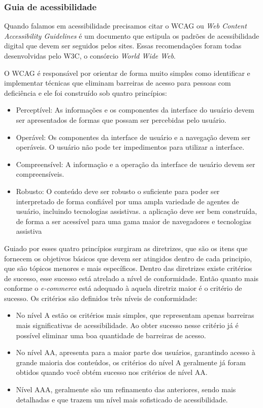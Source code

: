 \subsubsection{Guia de acessibilidade}
{Quando falamos em acessibilidade precisamos citar o WCAG ou \textit{Web Content Accessibility Guidelines} é um documento que estipula os padrões de acessibilidade digital que devem ser seguidos pelos sites. Essas recomendações foram todas desenvolvidas pelo W3C, o consórcio \textit{World Wide Web}.

O WCAG é responsável por orientar de forma muito simples como identificar e implementar técnicas que eliminam barreiras de acesso para pessoas com deficiência e ele foi construído sob quatro princípios:
\begin{itemize}
\item Perceptível: As informações e os componentes da interface do usuário devem ser apresentados de formas que possam ser percebidas pelo usuário.
\item Operável: Os componentes da interface de usuário e a navegação devem ser operáveis. O usuário não pode ter impedimentos para utilizar a interface.
\item Compreensível: A informação e a operação da interface de usuário devem ser compreensíveis. 
\item Robusto: O conteúdo deve ser robusto o suficiente para poder ser interpretado de forma confiável por uma ampla variedade de agentes de usuário, incluindo tecnologias assistivas. a aplicação deve ser bem construída, de forma a ser acessível para uma gama maior de navegadores e tecnologias assistiva
\end{itemize}

Guiado por esses quatro princípios surgiram as diretrizes, que são os itens que fornecem os objetivos básicos que devem ser atingidos dentro de cada principio, que são tópicos menores e mais específicos. Dentro das diretrizes existe critérios de sucesso, esse sucesso está atrelado a nível de conformidade. Então quanto mais conforme o \textit{e-commerce} está adequado à aquela diretriz maior é o critério de sucesso. Os critérios são definidos três níveis de conformidade:
\begin{itemize}
\item No nível A estão os critérios mais simples, que representam apenas barreiras mais significativas de acessibilidade. Ao obter sucesso nesse critério já é possível eliminar uma boa quantidade de barreiras de acesso. 
\item No nível AA,  apresenta para a maior parte dos usuários, garantindo acesso à grande maioria dos conteúdos, os critérios do nível A geralmente já foram obtidos quando você obtém sucesso nos critérios de nível AA.
\item Nível AAA, geralmente são um refinamento das anteriores, sendo mais detalhadas e que trazem um nível mais sofisticado de acessibilidade.
\end{itemize}

}
